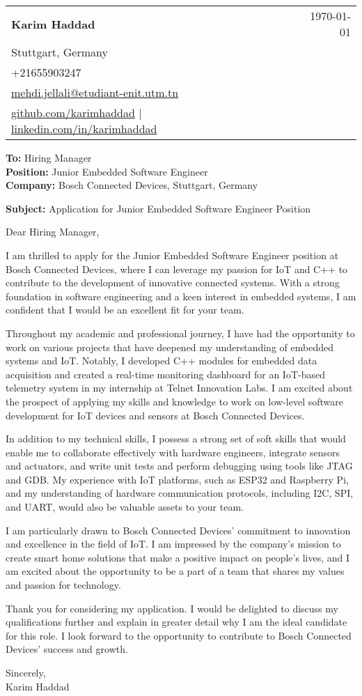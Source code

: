 \documentclass[letterpaper,11pt]{article}
\makeatletter
\newcommand{\letterHeading}[5]{
    \begin{tabular*}{\textwidth}{l@{\extracolsep{\fill}}r}
    \textbf{\Large #1} & #5 \\  %
    #2 & \\
    #3 & \\
    #4 & \\
    \end{tabular*}
    \vspace{15pt}
}
\newcommand{\letterRecipient}[3]{
    \textbf{\large To:} #1 \\
    \textbf{\large Position:} #2 \\
    \textbf{\large Company:} #3 \\
    \vspace{12pt}
}
\newcommand{\letterSubject}[1]{
    \textbf{\large Subject:} #1 \\
    \vspace{15pt}
}
\makeatother
\begin{document}
    \letterHeading
    {Karim Haddad}
    {Stuttgart, Germany}
    {+21655903247 \\ \href{mailto:mehdi.jellali@etudiant-enit.utm.tn}{mehdi.jellali@etudiant-enit.utm.tn}}
    {\href{https://github.com/karimhaddad}{github.com/karimhaddad} $|$ \href{https://www.linkedin.com/in/karimhaddad}{linkedin.com/in/karimhaddad}}
    {\today}

    \letterRecipient
    {Hiring Manager}
    {Junior Embedded Software Engineer}
    {Bosch Connected Devices, Stuttgart, Germany}

    \letterSubject{Application for Junior Embedded Software Engineer Position}

    Dear Hiring Manager,

    I am thrilled to apply for the Junior Embedded Software Engineer position at Bosch Connected Devices, where I can leverage my passion for IoT and C++ to contribute to the development of innovative connected systems. With a strong foundation in software engineering and a keen interest in embedded systems, I am confident that I would be an excellent fit for your team.

    Throughout my academic and professional journey, I have had the opportunity to work on various projects that have deepened my understanding of embedded systems and IoT. Notably, I developed C++ modules for embedded data acquisition and created a real-time monitoring dashboard for an IoT-based telemetry system in my internship at Telnet Innovation Labs. I am excited about the prospect of applying my skills and knowledge to work on low-level software development for IoT devices and sensors at Bosch Connected Devices.

    In addition to my technical skills, I possess a strong set of soft skills that would enable me to collaborate effectively with hardware engineers, integrate sensors and actuators, and write unit tests and perform debugging using tools like JTAG and GDB. My experience with IoT platforms, such as ESP32 and Raspberry Pi, and my understanding of hardware communication protocols, including I2C, SPI, and UART, would also be valuable assets to your team.

    I am particularly drawn to Bosch Connected Devices' commitment to innovation and excellence in the field of IoT. I am impressed by the company's mission to create smart home solutions that make a positive impact on people's lives, and I am excited about the opportunity to be a part of a team that shares my values and passion for technology.

    Thank you for considering my application. I would be delighted to discuss my qualifications further and explain in greater detail why I am the ideal candidate for this role. I look forward to the opportunity to contribute to Bosch Connected Devices' success and growth.

    Sincerely,\\[12pt]

    Karim Haddad
\end{document}

